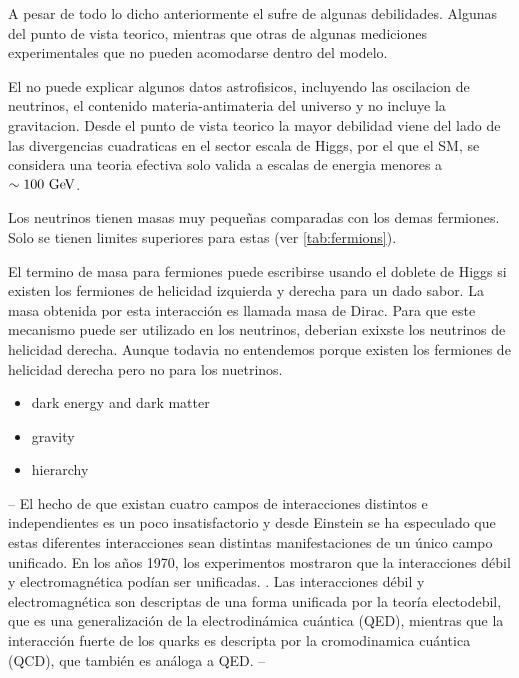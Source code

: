 A pesar de todo lo dicho anteriormente el {\SM} sufre de algunas debilidades. Algunas del
punto de vista teorico, mientras que otras de algunas mediciones experimentales que no pueden
acomodarse dentro del modelo.

El {\SM} no puede explicar algunos datos astrofisicos, incluyendo
las oscilacion de neutrinos, el contenido materia-antimateria del
universo y no incluye la gravitacion. Desde el punto de vista
teorico la mayor debilidad viene del lado de las divergencias
cuadraticas en el sector escala de Higgs, por el que el SM, se
considera una teoria efectiva solo valida a escalas de energia
menores a $\sim 100 \gev$.

Los neutrinos tienen masas muy peque\~nas comparadas con los demas fermiones. Solo se tienen
limites superiores para estas (ver \cref{tab:fermions}).

El termino de masa para fermiones puede escribirse usando el doblete de Higgs si existen
los fermiones de helicidad izquierda y derecha para un dado sabor. La masa obtenida por
esta interacci\'on es llamada masa de Dirac. Para que este mecanismo puede ser utilizado
en los neutrinos, deberian exixste los neutrinos de helicidad derecha. Aunque todavia
no entendemos porque existen los fermiones de helicidad derecha pero no para los nuetrinos.


\begin{itemize}\itemsep0.2cm\parskip0.2cm
\item  dark energy and dark matter

\item gravity

\item hierarchy
\end{itemize}


--
El hecho de que existan cuatro campos de interacciones distintos
e independientes es un poco insatisfactorio y desde Einstein se
ha especulado que estas diferentes interacciones sean distintas
manifestaciones de un único campo unificado. En los a\~nos 1970,
los experimentos mostraron que la interacciones débil y
electromagnética podían ser unificadas. .
Las interacciones débil y electromagnética son descriptas de una
forma unificada por la teoría electodebil, que es una generalización de la electrodinámica cuántica (QED), mientras
que la interacción fuerte de los quarks es descripta por la cromodinamica cuántica (QCD), que
también es análoga a QED.
--












